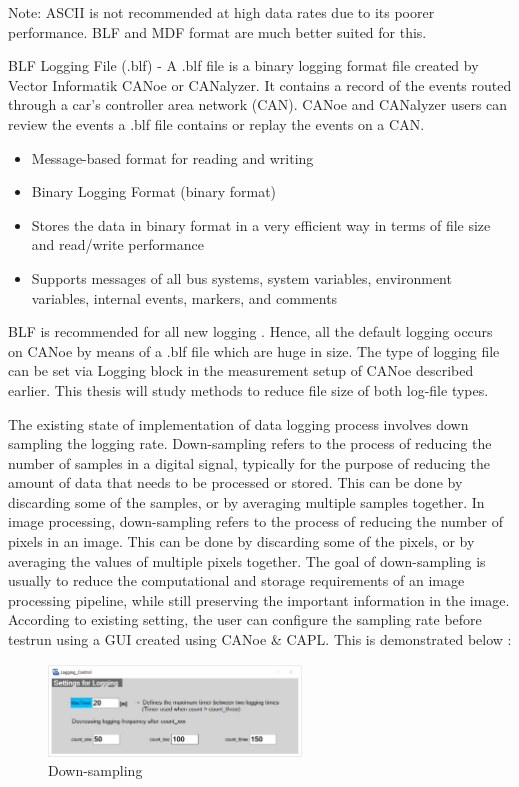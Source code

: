 Note: ASCII is not recommended at high data rates due to its poorer performance. BLF and MDF format are much better suited for this.

BLF Logging File (.blf) - A .blf file is a binary logging format file created by Vector Informatik CANoe or CANalyzer. It contains a record of the events routed through a car's controller area network (CAN). CANoe and CANalyzer users can review the events a .blf file contains or replay the events on a CAN.


\begin{itemize}
    \item Message-based format for reading and writing
    \item Binary Logging Format (binary format)
    \item Stores the data in binary format in a very efficient way in terms of file size and read/write performance
    \item Supports messages of all bus systems, system variables, environment variables, internal events, markers, and comments
\end{itemize}

BLF is recommended for all new logging \cite{blf}. Hence, all the default logging occurs on CANoe by means of a .blf file which are huge in size. The type of logging file can be set via Logging block in the measurement setup of CANoe described earlier. This thesis will study methods to reduce file size of both log-file types. 

The existing state of implementation of data logging process involves down sampling the logging rate. Down-sampling refers to the process of reducing the number of samples in a digital signal, typically for the purpose of reducing the amount of data that needs to be processed or stored. This can be done by discarding some of the samples, or by averaging multiple samples together. In image processing, down-sampling refers to the process of reducing the number of pixels in an image. This can be done by discarding some of the pixels, or by averaging the values of multiple pixels together. The goal of down-sampling is usually to reduce the computational and storage requirements of an image processing pipeline, while still preserving the important information in the image. According to existing setting, the user can configure the sampling rate before testrun using a GUI created using CANoe \& CAPL. This is demonstrated below : 

\begin{figure}[h]
  \centering
  \includegraphics[width= 0.6\textwidth]{images/loggingfreq.jpg}
  \caption{Down-sampling}
  \label{fig:downsampling}
\end{figure}

